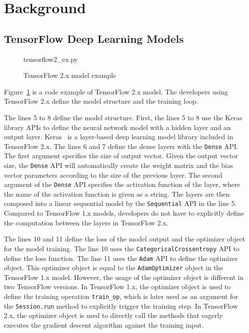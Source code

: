 \section{Background}\label{sec:background}

\subsection{TensorFlow Deep Learning Models}


\begin{figure}[ht!]

{tensorflow2_ex.py}
  \caption{TensorFlow 2.x model example}
\label{fig:back:tf2}
\end{figure}

Figure~\ref{fig:back:tf2} is a code example of TensorFlow 2.x model.
The developers using TensorFlow 2.x define the model structure and the training
loop. 

The lines 5 to 8 define the model structure.
First, the lines 5 to 8 use the Keras library APIs to define the neural
network model with a hidden layer and an output layer.
Keras~\cite{keras} is a layer-based deep learning model library included in 
TensorFlow 2.x. The lines 6 and 7 define the dense layers with the {\tt Dense} 
API. The first argument specifies the size of output vector.
Given the output vector size, the {\tt Dense} API will automatically create
the weight matrix and the bias vector parameters according to the size of 
the previous layer. The second argument of the {\tt Dense} API 
specifies the activation function of the layer,
where the name of the activation function is given as a string. 
The layers are then composed into a linear sequential model
by the {\tt Sequential} API in the line 5.
Compared to TensorFlow 1.x models, developers do not have to explicitly
define the computation between the layers in TensorFlow 2.x.

The lines 10 and 11 define the loss of the model output and
the optimizer object for the model training.
The line 10 uses the {\tt CategoricalCrossentropy} API to 
define the loss function.
The line 11 uses the {\tt Adam} API to define the optimizer object.
This optimizer object is equal to the {\tt AdamOptimizer} object in the 
TensorFlow 1.x model.
However, the usage of the optimizer object is different in two TensorFlow
versions.
In TensorFlow 1.x, the optimizer object is used to define the
training operation {\tt train\_op}, which is later used as an argument
for the {\tt Session.run} method to explicitly trigger the training step.
In TensorFlow 2.x, the optimizer object is used to directly call the methods 
that eagerly executes the gradient descent algorithm against the training input. 

